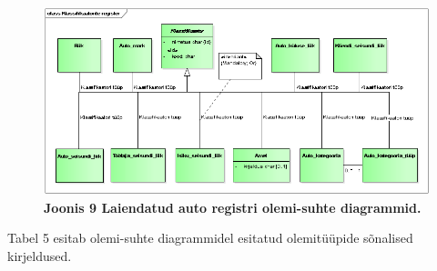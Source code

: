 \begin{figure}[H]
	\includegraphics[scale=1]{joonis9}
	\caption{\textbf{Joonis 9 Laiendatud auto registri olemi-suhte diagrammid.}}
\end{figure}

Tabel 5 esitab olemi-suhte diagrammidel esitatud olemitüüpide sõnalised kirjeldused.

